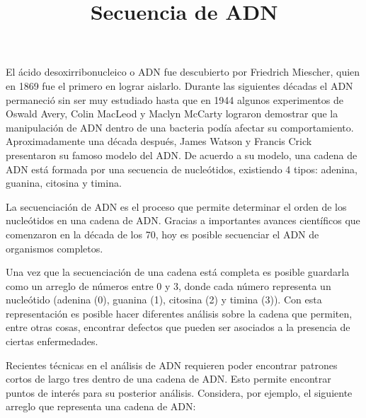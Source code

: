 \documentclass{oci}
\title{Secuencia de ADN}
\begin{document}
\begin{problemDescription}
  El ácido desoxirribonucleico o ADN fue descubierto por Friedrich Miescher,
  quien en 1869 fue el primero en lograr aislarlo.
  Durante las siguientes décadas el ADN permaneció sin ser muy estudiado hasta que
  en 1944 algunos experimentos de Oswald Avery, Colin MacLeod y Maclyn McCarty lograron
  demostrar que la manipulación de ADN dentro de una bacteria podía afectar su comportamiento.
  Aproximadamente una década después, James Watson y Francis Crick presentaron
  su famoso modelo del ADN.
  De acuerdo a su modelo, una cadena de ADN está formada por una secuencia
  de nucleótidos, existiendo 4 tipos: adenina, guanina, citosina y timina.

  La secuenciación de ADN es el proceso que permite determinar el orden de los
  nucleótidos en una cadena de ADN.
  Gracias a importantes avances científicos que comenzaron en la década de los 70, hoy
  es posible secuenciar el ADN de organismos completos.

  Una vez que la secuenciación de una cadena está completa es posible 
  guardarla como un arreglo de números entre 0 y 3, donde cada número
  representa un nucleótido (adenina (0), guanina (1), citosina (2) y timina (3)).
  Con esta representación es posible hacer diferentes análisis sobre la cadena que
  permiten, entre otras cosas, encontrar defectos que pueden ser asociados a la
  presencia de ciertas enfermedades.

  Recientes técnicas en el análisis de ADN requieren poder encontrar patrones
  cortos de largo tres dentro de una cadena de ADN.
  Esto permite encontrar puntos de interés para su posterior análisis.
  Considera, por ejemplo, el siguiente arreglo que representa una cadena de ADN:

  \begin{center}
  \end{center}


\end{problemDescription}
\end{document}
